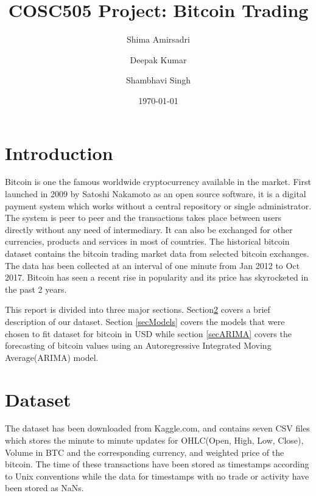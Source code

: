 \documentclass{article}
\begin{document}


\title{COSC505 Project: Bitcoin Trading}
\author{Shima Amirsadri \and Deepak Kumar \and Shambhavi Singh} 
\date{\today}
\maketitle

\section{Introduction}
Bitcoin is one the famous worldwide cryptocurrency available in the market. First launched in 2009 by Satoshi Nakamoto as an open source software, it is a digital payment system which works without a central repository or single administrator. The system is peer to peer and the transactions takes place between users directly without any need of intermediary. It can also be exchanged for other currencies, products and services in most of countries. The historical bitcoin dataset contains the bitcoin trading market data from selected bitcoin exchanges. The data has been collected at an interval of one minute from Jan 2012 to Oct 2017. Bitcoin has seen a recent rise in popularity and its price has skyrocketed in the past 2 years. 

This report is divided into three major sections. Section\ref{secDataset} covers a brief description of our dataset. Section \ref{secModels} covers the models that were chosen to fit dataset for bitcoin in USD while section \ref{secARIMA} covers the forecasting of bitcoin values using an Autoregressive Integrated Moving Average(ARIMA) model.

\section{Dataset} \label{secDataset}
The dataset has been downloaded from Kaggle.com, and contains seven CSV files which stores the minute to minute updates for OHLC(Open, High, Low, Close), Volume in BTC and the corresponding currency, and weighted price of the bitcoin. The time of these transactions have been stored as timestamps according to Unix conventions while the data for timestamps with no trade or activity have been stored as NaNs.
\end{document}
